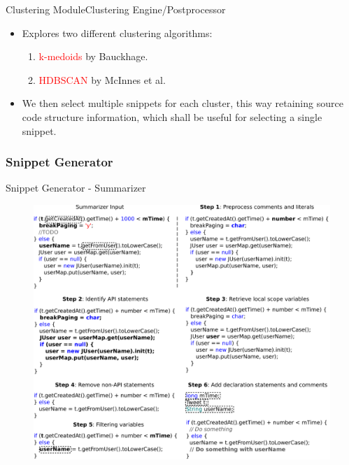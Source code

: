 \documentclass[11pt]{beamer}
\begin{document}
\begin{frame}{Clustering Module}{Clustering Engine/Postprocessor}
	\begin{itemize}
		\item {
			Explores two different clustering algorithms:
			\begin{enumerate}  
				\item {
					\textcolor{red}{k-medoids} by Bauckhage.
				}
				\item {
					\textcolor{red}{HDBSCAN} by McInnes et al.
				}
			\end{enumerate}
		}
		\vspace{15pt}
		\item{
		      We then select multiple snippets for each cluster, this way retaining source code structure information, which shall be useful for selecting a single snippet.
		}  
	\end{itemize}
	 
\end{frame}

\subsubsection*{Snippet Generator}

\begin{frame}{Snippet Generator - Summarizer}
	\begin{figure}
		\includegraphics[scale=0.4]{SummarizerFlow}
	\end{figure}
\end{frame}
\end{document}

